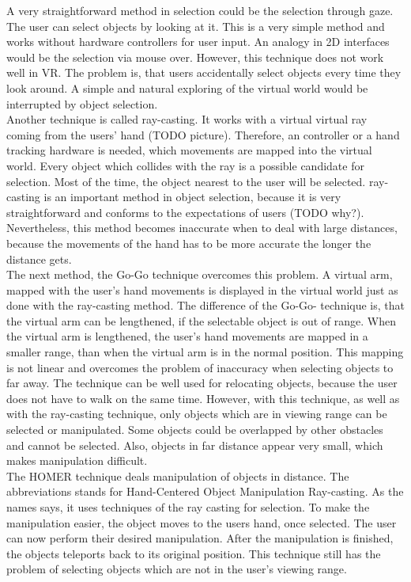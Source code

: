 A very straightforward method in selection could be the selection through gaze. The user can select objects by looking at it. This is a very simple method and works without hardware controllers for user input. An analogy in 2D interfaces would be the selection via mouse over. However, this technique does not work well in VR. The problem is, that users accidentally select objects every time they look around. A simple and natural exploring of the virtual world would be interrupted by object selection.\\
Another technique is called ray-casting. It works with a virtual virtual ray coming from the users' hand (TODO picture). Therefore, an controller or a hand tracking hardware is needed, which movements are mapped into the virtual world. Every object which collides with the ray is a possible candidate for selection. Most of the time, the object nearest to the user will be selected. ray-casting is an important method in object selection, because it is very straightforward and conforms to the expectations of users (TODO why?). Nevertheless, this method becomes inaccurate when to deal with large distances, because the movements of the hand has to be more accurate the longer the distance gets. \\
The next method, the Go-Go technique overcomes this problem. A virtual arm, mapped with the user's hand movements is displayed in the virtual world just as done with the ray-casting method. The difference of the Go-Go- technique is, that the virtual arm can be lengthened, if the selectable object is out of range. When the virtual arm is lengthened, the user's hand movements are mapped in a smaller range, than when the virtual arm is in the normal position. This mapping is not linear and overcomes the problem of inaccuracy when selecting objects to far away. The technique can be well used for relocating objects, because the user does not have to walk on the same time. However, with this technique, as well as with the ray-casting technique, only objects which are in viewing range can be selected or manipulated. Some objects could be overlapped by other obstacles and cannot be selected. Also, objects in far distance appear very small, which makes manipulation difficult.\\
The HOMER technique deals manipulation of objects in distance. The abbreviations stands for Hand-Centered Object Manipulation Ray-casting. As the names says, it uses techniques of the ray casting for selection. To make the manipulation easier, the object moves to the users hand, once selected. The user can now perform their desired manipulation. After the manipulation is finished, the objects teleports back to its original position. This technique still has the problem of selecting objects which are not in the user's viewing range.\\

